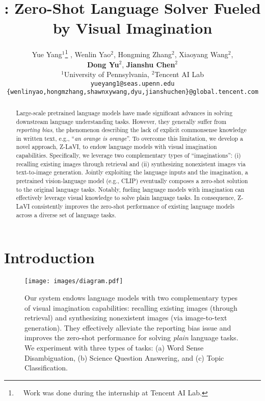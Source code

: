 \documentclass[11pt]{article}
\title{\model: Zero-Shot Language Solver Fueled by Visual Imagination}
\author{Yue Yang$^{1}$\thanks{~~Work was done during the internship at Tencent AI Lab.} , Wenlin Yao$^{2}$, Hongming Zhang$^{2}$, Xiaoyang Wang$^{2}$, \\\textbf{Dong Yu}$^{2}$, \textbf{Jianshu Chen}$^{2}$ \\
$^{1}$University of Pennsylvania, $^{2}$Tencent AI Lab\\
{\small \tt {yueyang1@seas.upenn.edu}}\\
{\small {\tt \{wenlinyao,hongmzhang,shawnxywang,dyu,jianshuchen\}@global.tencent.com}}}
\begin{document}
\maketitle
\begin{abstract}
Large-scale pretrained language models have made significant advances in solving downstream language understanding tasks. However, they generally suffer from \emph{reporting bias}, the phenomenon describing the lack of explicit commonsense knowledge in written text, e.g., ``\textit{an orange is orange}''.
To overcome this limitation, we develop a novel approach, Z-LaVI, to endow language models with visual imagination capabilities. Specifically, we leverage two complementary types of ``imaginations'': (i) recalling existing images through retrieval and (ii) synthesizing nonexistent images via text-to-image generation. Jointly exploiting the language inputs and the imagination, a pretrained vision-language model (e.g., CLIP) eventually composes a zero-shot solution to the original language tasks. Notably, fueling language models with imagination can effectively leverage visual knowledge to solve plain language tasks. In consequence, Z-LaVI consistently improves the zero-shot performance of existing language models across a diverse set of language tasks.\protect\footnotemark





\end{abstract}

\section{Introduction}

\begin{figure}[!t]
\centering
    \texttt{[image: images/diagram.pdf]}
    \caption{Our system endows language models with two complementary types of visual imagination capabilities: recalling existing images (through retrieval) and synthesizing nonexistent images (via image-to-text generation). They effectively alleviate the reporting bias issue and improves the zero-shot performance for solving \emph{plain} language tasks. We experiment with three types of tasks: (a) Word Sense Disambiguation, (b) Science Question Answering, and (c) Topic Classification.}
    \label{fig:tasks_convertion}
\end{figure}
\end{document}
